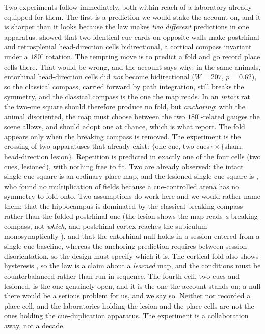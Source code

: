 Two experiments follow immediately, both within reach of a laboratory already equipped for them. The
first is a prediction we would stake the account on, and it is sharper than it looks because the law
makes \emph{two different} predictions in one apparatus. \citet{lachance2024} showed that two identical
cue cards on opposite walls make postrhinal and retrosplenial head-direction cells bidirectional, a
cortical compass invariant under a $180^\circ$ rotation. The tempting move is to predict a fold and go
record place cells there. That would be wrong, and the account says why: in the same animals, entorhinal
head-direction cells did \emph{not} become bidirectional ($W = 207$, $p = 0.62$), so the classical
compass, carried forward by path integration, still breaks the symmetry, and the classical compass is
the one the map reads. In an \emph{intact} rat the two-cue square should therefore produce no fold, but
\emph{anchoring}: with the animal disoriented, the map must choose between the two $180^\circ$-related
gauges the scene allows, and should adopt one at chance, which is what \citet{keinath2017} report. The
fold appears only when the breaking compass is removed. The experiment is the crossing of two apparatuses
that already exist: $\{$one cue, two cues$\} \times \{$sham, head-direction lesion$\}$. Repetition is
predicted in exactly one of the four cells (two cues, lesioned), with nothing free to fit. Two are
already observed: the intact single-cue square is an ordinary place map, and the lesioned single-cue
square is \citet{calton2003}, who found no multiplication of fields because a cue-controlled arena has no
symmetry to fold onto. Two assumptions do work here and we would rather name them: that the hippocampus
is dominated by the classical breaking compass rather than the folded postrhinal one (the lesion shows
the map reads \emph{a} breaking compass, not \emph{which}, and postrhinal cortex reaches the subiculum
monosynaptically \citep{naber2001}), and that the entorhinal null holds in a session entered from a
single-cue baseline, whereas the anchoring prediction requires between-session disorientation, so the
design must specify which it is. The cortical fold also shows hysteresis \citep{lachance2024}, so the law
is a claim about a \emph{learned} map, and the conditions must be counterbalanced rather than run in
sequence. The fourth cell, two cues and lesioned, is the one genuinely open, and it is the one the
account stands on; a null there would be a serious problem for us, and we say so. Neither
\citet{lachance2024} nor \citet{zhang2022} recorded a place cell, and the laboratories holding the lesion
and the place cells \citep{harland2017} are not the ones holding the cue-duplication apparatus. The
experiment is a collaboration away, not a decade.

